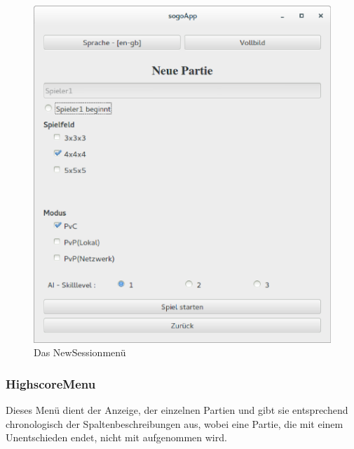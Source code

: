 \documentclass[a4paper]{scrartcl}
\begin{document}
\begin{figure}[H]
 \centering
 \includegraphics[scale=0.35]{graphics/newsession.eps}
 \caption{Das NewSessionmenü}
 \label{fig:NewSessionmenü}
\end{figure}

\subsubsection{HighscoreMenu}\label{ch:HighscoreMenu}
Dieses Menü dient der Anzeige, der einzelnen Partien und gibt sie entsprechend chronologisch der Spaltenbeschreibungen aus, wobei eine Partie, die mit einem Unentschieden endet, nicht mit aufgenommen wird.
\end{document}
